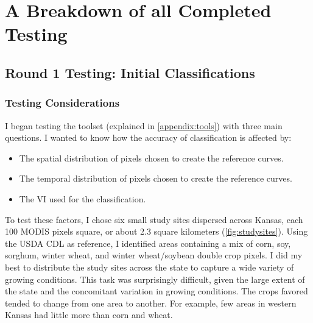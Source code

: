 \chapter{A Breakdown of all Completed Testing}
\label{appendix:testing}

\section{Round 1 Testing: Initial Classifications}
\subsection*{Testing Considerations}

I began testing the toolset (explained in \autoref{appendix:tools}) with three main questions. I wanted to know how the accuracy of classification is affected by:

\begin{Spacing}{1.2}
\begin{itemize}
  \item The spatial distribution of pixels chosen to create the reference curves.
  \item The temporal distribution of pixels chosen to create the reference curves.
  \item The VI used for the classification.
\end{itemize}
\end{Spacing}

To test these factors, I chose six small study sites dispersed across Kansas, each 100 MODIS pixels square, or about 2.3 square kilometers (\autoref{fig:studysites}). Using the USDA CDL as reference, I identified areas containing a mix of corn, soy, sorghum, winter wheat,  and winter wheat/soybean double crop pixels. I did my best to distribute the study sites across the state to capture a wide variety of growing conditions. This task was surprisingly difficult, given the large extent of the state and the concomitant variation in growing conditions. The crops favored tended to change from one area to another. For example, few areas in western Kansas had little more than corn and wheat.

